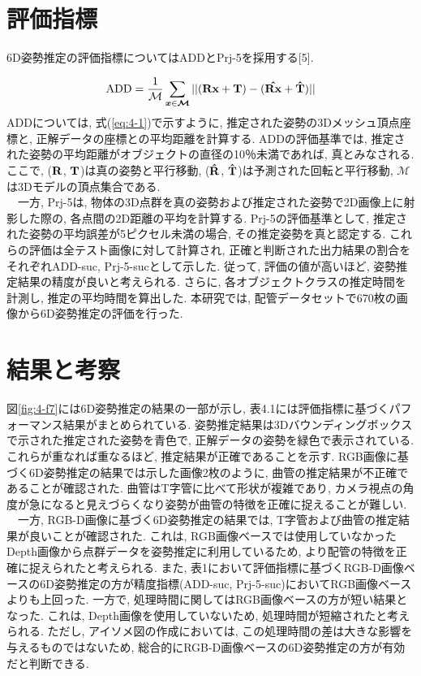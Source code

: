 \section{評価指標}
6D姿勢推定の評価指標についてはADDとPrj-5を採用する[5]. 

\begin{equation}
\textrm{ADD} = \frac{1}{\mathcal{M}}\sum_{\boldsymbol{x}\in \boldsymbol{\mathcal{M}}}||(\boldsymbol{\textrm{\textbf{Rx}}} + \boldsymbol{\textrm{\textbf{\textbf{T}}}}) - (\boldsymbol{\hat{\textrm{\textbf{Rx}}}} +  \boldsymbol{\hat{\textrm{\textbf{T}}}})||
\label{eq:4-1}
\end{equation}
ADDについては, 式(\ref{eq:4-1})で示すように, 推定された姿勢の3Dメッシュ頂点座標と, 正解データの座標との平均距離を計算する. 
ADDの評価基準では, 推定された姿勢の平均距離がオブジェクトの直径の10％未満であれば, 真とみなされる. 
ここで, ($\boldsymbol{\textrm{\textbf{R}}}$, $\boldsymbol{\textrm{\textbf{T}}}$)は真の姿勢と平行移動,  ($\boldsymbol{\hat{\textrm{\textbf{R}}}}$, $\boldsymbol{\hat{\textrm{\textbf{T}}}}$)は予測された回転と平行移動, $\boldsymbol{\mathcal{M}}$は3Dモデルの頂点集合である. \\
　一方, Prj-5は, 物体の3D点群を真の姿勢および推定された姿勢で2D画像上に射影した際の, 各点間の2D距離の平均を計算する. 
Prj-5の評価基準として, 推定された姿勢の平均誤差が5ピクセル未満の場合, その推定姿勢を真と認定する. 
これらの評価は全テスト画像に対して計算され, 正確と判断された出力結果の割合をそれぞれADD-suc, Prj-5-sucとして示した. 
従って, 評価の値が高いほど, 姿勢推定結果の精度が良いと考えられる. 
さらに, 各オブジェクトクラスの推定時間を計測し, 推定の平均時間を算出した. 
本研究では, 配管データセットで670枚の画像から6D姿勢推定の評価を行った. 


\section{結果と考察}
図\ref{fig:4-f7}には6D姿勢推定の結果の一部が示し, 表4.1には評価指標に基づくパフォーマンス結果がまとめられている. 
姿勢推定結果は3Dバウンディングボックスで示された推定された姿勢を青色で, 正解データの姿勢を緑色で表示されている. 
これらが重なれば重なるほど, 推定結果が正確であることを示す. 
RGB画像に基づく6D姿勢推定の結果では示した画像2枚のように, 曲管の推定結果が不正確であることが確認された. 
曲管はT字管に比べて形状が複雑であり, カメラ視点の角度が急になると見えづらくなり姿勢が曲管の特徴を正確に捉えることが難しい. \\
　一方, RGB-D画像に基づく6D姿勢推定の結果では, T字管および曲管の推定結果が良いことが確認された. 
これは, RGB画像ベースでは使用していなかったDepth画像から点群データを姿勢推定に利用しているため, より配管の特徴を正確に捉えられたと考えられる. 
また, 表1において評価指標に基づくRGB-D画像ベースの6D姿勢推定の方が精度指標(ADD-suc, Prj-5-suc)においてRGB画像ベースよりも上回った. 
一方で, 処理時間に関してはRGB画像ベースの方が短い結果となった. 
これは, Depth画像を使用していないため, 処理時間が短縮されたと考えられる. 
ただし, アイソメ図の作成においては, この処理時間の差は大きな影響を与えるものではないため, 総合的にRGB-D画像ベースの6D姿勢推定の方が有効だと判断できる. 

